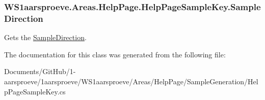 \subsubsection[{Sample\+Direction}]{ W\+S1aarsproeve.\+Areas.\+Help\+Page.\+Help\+Page\+Sample\+Key.\+Sample\+Direction\hspace{0.3cm}{\ttfamily [get]}}\label{class_w_s1aarsproeve_1_1_areas_1_1_help_page_1_1_help_page_sample_key_a4d02725ac4f265d06bfb42d669de3edc}


Gets the \hyperlink{class_w_s1aarsproeve_1_1_areas_1_1_help_page_1_1_help_page_sample_key_a4d02725ac4f265d06bfb42d669de3edc}{Sample\+Direction}. 



The documentation for this class was generated from the following file\+:\begin{DoxyCompactItemize}
\item 
Documents/\+Git\+Hub/1-\/aarsproeve/1aarsproeve/\+W\+S1aarsproeve/\+Areas/\+Help\+Page/\+Sample\+Generation/Help\+Page\+Sample\+Key.\+cs\end{DoxyCompactItemize}
